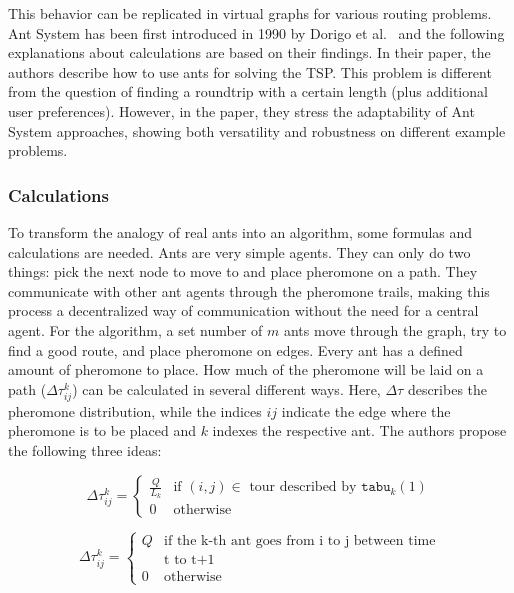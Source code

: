 This behavior can be replicated in virtual graphs for various routing problems.
Ant System has been first introduced in 1990 by Dorigo et al.\ \cite{dorigo_ant_1996} and the following explanations about calculations are based on their findings.
In their paper, the authors describe how to use ants for solving the TSP.
This problem is different from the question of finding a roundtrip with a certain length (plus additional user preferences).
However, in the paper, they stress the adaptability of Ant System approaches, showing both versatility and robustness on different example problems.


\subsubsection{Calculations}
\label{subsubsec:antCalculations}

To transform the analogy of real ants into an algorithm, some formulas and calculations are needed.
Ants are very simple agents. 
They can only do two things:
pick the next node to move to and place pheromone on a path.
They communicate with other ant agents through the pheromone trails, making this process a decentralized way of communication without the need for a central agent.
For the algorithm, a set number of $m$ ants move through the graph, try to find a good route, and place pheromone on edges.
Every ant has a defined amount of pheromone to place. 
How much of the pheromone will be laid on a path ($\Delta\tau_{ij}^k$) can be calculated in several different ways.
Here, $\Delta\tau$ describes the pheromone distribution, while the indices $ij$ indicate the edge where the pheromone is to be placed and $k$ indexes the respective ant.
The authors propose the following three ideas:

\begin{equation}\label{eq:antCycle}
	\Delta\tau_{ij}^k = \begin{cases}
			\frac{Q}{L_k} &\text{if $(i,j) \in$ tour described by $\texttt{tabu}_k(1)$} \\
			0 &\text{otherwise}
	\end{cases}	
\end{equation}


\begin{equation}\label{eq:antDensity}
	\Delta\tau_{ij}^k = \begin{cases}
	Q &\text{if the k-th ant goes from i to j between time} \\
	&\text{t to t+1} \\
	0 &\text{otherwise}
\end{cases}	
\end{equation}


